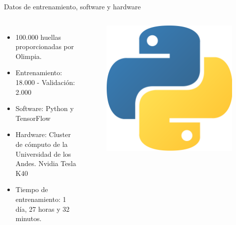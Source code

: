 \documentclass[12pt,aspectratio=169]{beamer}
\begin{document}
\begin{frame}{Datos de entrenamiento, software y hardware}

    \begin{columns}[c] 
            \begin{itemize}
                \item 100.000 huellas proporcionadas por Olimpia.
                \vspace{3mm}
                \item Entrenamiento: 18.000 - Validación: 2.000
                \vspace{3mm}
                \item Software: Python y TensorFlow
                \vspace{3mm}
                \item Hardware: Cluster de cómputo de la Universidad de los Andes. Nvidia Tesla K40
                \vspace{3mm}
                \item Tiempo de entrenamiento: 1 día, 27 horas y 32 minutos.
            \end{itemize}
            \begin{figure}
                \includegraphics[scale=0.04]{figs/python}
            \end{figure}

\end{columns}
\end{frame}
\end{document}
